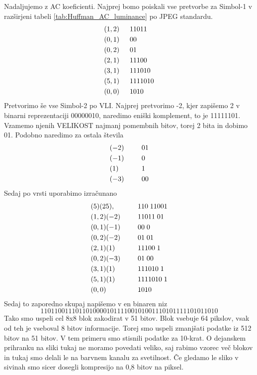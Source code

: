 \documentclass[a4paper,12pt,openright]{book}
\begin{document}
Nadaljujemo z AC koeficienti. Najprej bomo poiskali vse pretvorbe za Simbol-1 v razširjeni tabeli \ref{tab:Huffman_AC_luminance} po JPEG standardu. 
\begin{equation*}
  \begin{aligned}
    &(1,2)\indent 11011   \\
    &(0,1)\indent 00   \\
    &(0,2)\indent 01   \\
    &(2,1)\indent 11100   \\
    &(3,1)\indent 111010   \\
    &(5,1)\indent 1111010   \\
    &(0,0)\indent 1010 
  \end{aligned}
\end{equation*}
Pretvorimo še vse Simbol-2 po VLI. Najprej pretvorimo -2, kjer zapišemo 2 v binarni reprezentaciji 00000010, naredimo eniški komplement, to je 11111101. Vzamemo njenih VELIKOST najmanj pomembnih bitov, torej 2 bita in dobimo 01. Podobno naredimo za ostala števila
\begin{alignat*}{2}
    &(-2) \indent && 01 \\
    &(-1) \indent && 0 \\
    &(1)  \indent && 1 \\ 
    &(-3) \indent && 00 
\end{alignat*}
Sedaj po vrsti uporabimo izračunano
\begin{alignat*}{2}
    &(5)(25),  \indent  &&110\;11001\\
    &(1,2)(-2) \indent  &&11011\;01\\
    &(0,1)(-1) \indent  &&00\;0\\
    &(0,2)(-2) \indent  &&01\;01\\
    &(2,1)(1)  \indent  &&11100\;1\\
    &(0,2)(-3) \indent  &&01\;00\\
    &(3,1)(1)  \indent  &&111010\;1\\
    &(5,1)(1)  \indent  &&1111010\;1\\
    &(0,0)     \indent  &&1010
\end{alignat*}
Sedaj to zaporedno skupaj napišemo v en binaren niz 
\begin{equation*}
110110011101101000010111100101001110101111101011010
\end{equation*}
Tako smo uspeli cel 8x8 blok zakodirat v 51 bitov. Blok vsebuje 64 pikslov, vsak od teh je vseboval 8 bitov informacije. Torej smo uspeli zmanjšati podatke iz 512 bitov na 51 bitov. V tem primeru smo stisnili podatke za 10-krat. O dejanskem prihranku na sliki tukaj ne moramo povedati veliko, saj rabimo vzorec več blokov in tukaj smo delali le na barvnem kanalu za svetilnost. Če gledamo le sliko v sivinah smo sicer dosegli kompresijo na 0,8 bitov na piksel.
\end{document}
